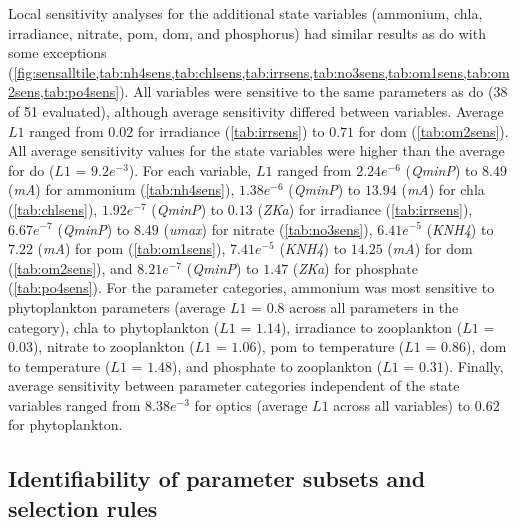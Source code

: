 \documentclass[review]{elsarticle}\usepackage[]{graphicx}\usepackage[]{color}
\begin{document}
Local sensitivity analyses for the additional state variables (ammonium, \ac{chla}, irradiance, nitrate, \ac{pom}, \ac{dom}, and phosphorus) had similar results as \ac{do} with some exceptions (\cref{fig:sensalltile,tab:nh4sens,tab:chlsens,tab:irrsens,tab:no3sens,tab:om1sens,tab:om2sens,tab:po4sens}).  All variables were sensitive to the same parameters as \ac{do} (38 of 51 evaluated), although average sensitivity differed between variables.  Average $L1$ ranged from $0.02$ for irradiance (\cref{tab:irrsens}) to $0.71$ for \ac{dom} (\cref{tab:om2sens}).  All average sensitivity values for the state variables were higher than the average for \ac{do} ($L1$ = $9.2e^{-3}$).  For each variable, $L1$ ranged from $2.24e^{-6}$ (\textit{QminP}) to $8.49$ (\textit{mA}) for ammonium (\cref{tab:nh4sens}), $1.38e^{-6}$ (\textit{QminP}) to $13.94$ (\textit{mA}) for \ac{chla} (\cref{tab:chlsens}), $1.92e^{-7}$ (\textit{QminP}) to $0.13$ (\textit{ZKa}) for irradiance (\cref{tab:irrsens}), $6.67e^{-7}$ (\textit{QminP}) to $8.49$ (\textit{umax}) for nitrate (\cref{tab:no3sens}), $6.41e^{-5}$ (\textit{KNH4}) to $7.22$ (\textit{mA}) for \ac{pom} (\cref{tab:om1sens}),  $7.41e^{-5}$ (\textit{KNH4}) to $14.25$ (\textit{mA}) for \ac{dom} (\cref{tab:om2sens}), and $8.21e^{-7}$ (\textit{QminP}) to $1.47$ (\textit{ZKa}) for phosphate (\cref{tab:po4sens}).  For the parameter categories, ammonium was most sensitive to phytoplankton parameters (average $L1$ = $0.8$ across all parameters in the category), \ac{chla} to phytoplankton ($L1$ = $1.14$), irradiance to zooplankton ($L1$ = $0.03$), nitrate to zooplankton ($L1$ = $1.06$), \ac{pom} to temperature ($L1$ = $0.86$), \ac{dom} to temperature ($L1$ = $1.48$), and phosphate to zooplankton ($L1$ = $0.31$).  Finally, average sensitivity between parameter categories independent of the state variables ranged from $8.38e^{-3}$ for optics (average $L1$ across all variables) to $0.62$ for phytoplankton. 

\subsection{Identifiability of parameter subsets and selection rules}
\end{document}
